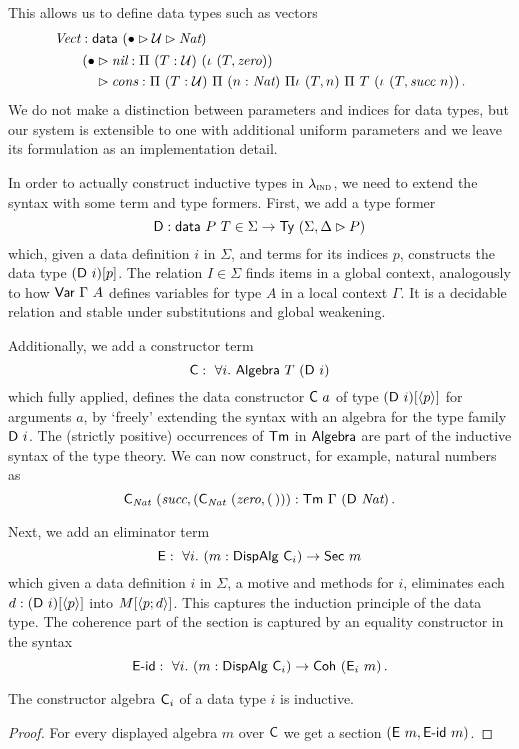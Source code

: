 This allows us to define data types such as vectors
\begin{align*}
	 & \textit{Vect} : \textsf{data}\ (\bullet \rhd \mathcal{U} \rhd \textit{Nat})               \\
	 & \quad\begin{aligned}
		        \quad (\bullet & \rhd \textit{nil} : \Pi\ (T : \mathcal{U})\ (\iota\ (T, \textit{zero}))                                                          \\
		        \quad          & \rhd \textit{cons} : \Pi\ (T : \mathcal{U})\ \Pi\ (n : \textit{Nat})\ \Pi\iota\ (T, n)\ \Pi\ T\ (\iota\ (T, \textit{succ}\ n)) \,.
	        \end{aligned}
\end{align*}
We do not make a distinction between parameters and indices for data types, but
our system is extensible to one with additional uniform parameters and we leave its
formulation as an implementation detail.

In order to actually construct inductive types in $\lambda_{\textsc{ind}}$, we need to
extend the syntax with some term and type formers. First, we add a type former
\[
	\mta{D} : \mta{data}\ P\ T \in \Sigma \to \Ty\ (\Sigma, \Delta \rhd P)
\]
which, given a data definition $i$ in $\Sigma$, and terms for its
indices $p$, constructs the data type $(\mta{D}\ i)[p]$. The relation $I \in
\Sigma$ finds items in a global context, analogously to how
$\mta{Var}\ \Gamma\ A$ defines variables for type $A$ in a local context
$\Gamma$. It is a decidable relation and stable under substitutions and global weakening.

Additionally, we add a constructor term
\[
	\mta{C} :\ \forall i.\ \mta{Algebra}\ T\ (\mta{D}\ i)
\]
which fully applied, defines the data constructor $\textsf{C}\ a$ of type
$(\textsf{D}\ i)[\langle p\rangle]$ for arguments $a$, by `freely' extending the syntax with
an algebra for the type family $\textsf{D}\ i$. The (strictly positive) occurrences
of $\textsf{Tm}$ in $\textsf{Algebra}$ are part of the inductive syntax of the type
theory. We can now construct, for example, natural numbers as
\[
    \mta{C}_{\textit{Nat}}\ (\textit{succ}, (\mta{C}_{\textit{Nat}}\ (\textit{zero}, (\,))) : \mta{Tm}\ \Gamma\ (\mta{D}\ \textit{Nat}) \,.
\]

Next, we add an eliminator term
\[
	\textsf{E} :\ \forall i.\ (m : \textsf{DispAlg}\ \textsf{C}_i) \to \textsf{Sec}\ m
\]
which given a data definition $i$ in $\Sigma$, a motive and methods for $i$,
eliminates each $d : (\textsf{D}\ i)[\langle p\rangle]$ into $M[\langle p;d\rangle]$. This captures
the induction principle of the data type. The coherence part of the section is
captured by an equality constructor in the syntax
\[
	\mta{E-id} :\ \forall i.\ (m : \mta{DispAlg}\ \mta{C}_i) \to \mta{Coh}\ (\mta{E}_i\ m) \,.
\]
\vspace{-2em}
\begin{lemma}
	The constructor algebra $\textsf{C}_i$ of a data type $i$ is inductive.
	\begin{proof}
		For every displayed algebra $m$ over $\textsf{C}$ we get a section $(\textsf{E}\ m, \textsf{E-id}\ m)$.
	\end{proof}
\end{lemma}

